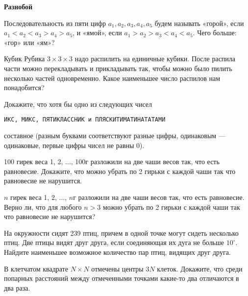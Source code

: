 \documentclass{article}
\begin{document}
    \large

    \begin{center}
        \textbf{Разнобой}
    \end{center}

    \begin{enumerate_boxed}
        \item Последовательность из пяти цифр $a_1, a_2, a_3, a_4, a_5$ будем называть «горой», если $a_1 < a_2 < a_3 > a_4 > a_5$, и «ямой», если $a_1 > a_2 > a_3 < a_4 < a_5$.
        Чего больше: «гор» или «ям»?

        \item Кубик Рубика $3 \times 3 \times 3$ надо распилить на единичные кубики.
        После распила части можно перекладывать и прикладывать так, чтобы можно было пилить несколько частей одновременно.
        Какое наименьшее число распилов нам понадобится?

        \item Докажите, что хотя бы одно из следующих чисел
        \begin{center}
            \texttt{ИКС, МИКС, ПЯТИКЛАССНИК и ПЛЯСКИТИМАТИНАТАТАМИ}
        \end{center}
        составное (разным буквами соответствуют разные цифры, одинаковым — одинаковые, первые цифры чисел не равны 0).

        \item 100 гирек веса 1, 2, $\dotsc$, 100г разложили на две чаши весов так, что есть равновесие.
        Докажите, что можно убрать по 2 гирьки с каждой чаши так что равновесие не нарушится.

        \item $n$ гирек веса 1, 2, $\dotsc$, $n$г разложили на две чаши весов так, что есть равновесие.
        Верно ли, что для любого $n > 3$ можно убрать по 2 гирьки с каждой чаши так что равновесие не нарушится?

        \item На окружности сидят 239 птиц, причем в одной точке могут сидеть несколько птиц.
        Две птицы видят друг друга, если соединяющая их дуга не больше $10^\circ$.
        Найдите наименьшее возможное количество пар птиц, видящих друг друга.

        \item В клетчатом квадрате $N\times N$ отмечены центры $3N$ клеток.
        Докажите, что среди попарных расстояний между отмеченными точками какие-то два отличаются в два раза.

    \end{enumerate_boxed}
\end{document}
